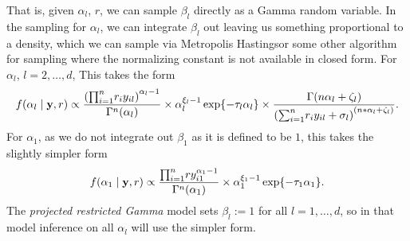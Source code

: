   That is, given $\alpha_l$, $r$, we can sample $\beta_l$ directly as a Gamma random variable.  In
  the sampling for $\alpha_l$, we can integrate $\beta_l$ out leaving us something proportional
  to a density, which we can sample via Metropolis Hastings\findcite or some other algorithm for
  sampling where the normalizing constant is not available in closed form.  For $\alpha_l$,
  $l = 2,\ldots, d$, This takes the form
  \begin{equation}
    \label{eqn:alphafc}
    f(\alpha_l \mid {\bf y}, r) \propto
    \frac{\left({\small \prod}_{i = 1}^nr_iy_{il}\right)^{\alpha_l - 1}}{\Gamma^n(\alpha_l)} \times
    \alpha_l^{\xi_l - 1}\exp\{-\tau_l\alpha_l\} \times
    \frac{\Gamma(n\alpha_l + \zeta_l)}{
        \left({\small\sum}_{i = 1}^n r_iy_{il} + \sigma_l\right)^{(n * \alpha_l + \zeta_l)}}.
  \end{equation}
  For $\alpha_1$, as we do not integrate out $\beta_1$ as it is defined to be $1$, this takes the
  slightly simpler form
  \begin{equation}
    \label{eqn:alphafc1}
    f(\alpha_1 \mid {\bf y}, r) \propto
      \frac{{\small\prod}_{i = 1}^n ry_{i1}^{\alpha_1 - 1}}{\Gamma^n(\alpha_1)} \times
      \alpha_1^{\xi_1 - 1}\exp\{-\tau_1\alpha_1\}.
  \end{equation}
  The \emph{projected restricted Gamma} model sets $\beta_l := 1$ for all $l = 1,\ldots,d$, so in that
  model inference on all $\alpha_l$ will use the simpler form.

